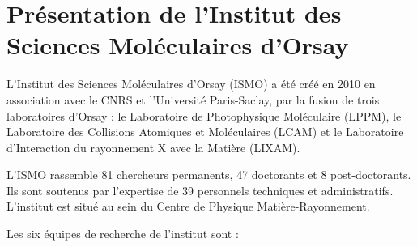







\section{Présentation de l'Institut des Sciences Moléculaires d'Orsay}

L'Institut des Sciences Moléculaires d'Orsay (ISMO) a été créé en 2010 en association avec le CNRS et l'Université Paris-Saclay, par la fusion de trois laboratoires d'Orsay : le Laboratoire de Photophysique Moléculaire (LPPM), le Laboratoire des Collisions Atomiques et Moléculaires (LCAM) et le Laboratoire d'Interaction du rayonnement X avec la Matière (LIXAM).

L'ISMO rassemble 81 chercheurs permanents, 47 doctorants et 8 post-doctorants. Ils sont soutenus par l'expertise de 39 personnels techniques et administratifs. L'institut est situé au sein du Centre de Physique Matière-Rayonnement.

Les six équipes de recherche de l'institut sont :

